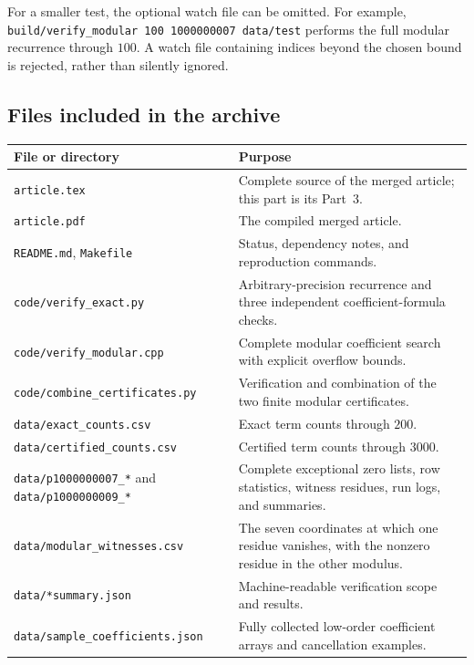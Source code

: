 \documentclass[11pt,a4paper]{article}
\numberwithin{equation}{section}
\theoremstyle{definition}
\theoremstyle{remark}
\theoremstyle{plain}
\begin{document}
For a smaller test, the optional watch file can be omitted. For example,
\texttt{build/verify\_modular 100 1000000007 data/test} performs the full
modular recurrence through $100$. A watch file containing indices beyond
the chosen bound is rejected, rather than silently ignored.

\subsection{Files included in the archive}
\begin{longtable}{@{}>{\raggedright\arraybackslash}p{}>{\raggedright\arraybackslash}p{}@{}}
\toprule
File or directory & Purpose\\
\midrule
\endhead
\texttt{article.tex} & Complete source of the merged article; this part is its Part~3.\\
\texttt{article.pdf} & The compiled merged article.\\
\texttt{README.md}, \texttt{Makefile} & Status, dependency notes, and reproduction commands.\\
\texttt{code/verify\_exact.py} & Arbitrary-precision recurrence and three independent coefficient-formula checks.\\
\texttt{code/verify\_modular.cpp} & Complete modular coefficient search with explicit overflow bounds.\\
\texttt{code/combine\_certificates.py} & Verification and combination of the two finite modular certificates.\\
\texttt{data/exact\_counts.csv} & Exact term counts through $200$.\\
\texttt{data/certified\_counts.csv} & Certified term counts through $3000$.\\
\texttt{data/p1000000007\_*} and \texttt{data/p1000000009\_*} & Complete exceptional zero lists, row statistics, witness residues, run logs, and summaries.\\
\texttt{data/modular\_witnesses.csv} & The seven coordinates at which one residue vanishes, with the nonzero residue in the other modulus.\\
\texttt{data/*summary.json} & Machine-readable verification scope and results.\\
\texttt{data/sample\_coefficients.json} & Fully collected low-order coefficient arrays and cancellation examples.\\
\bottomrule
\end{longtable}

\end{document}
